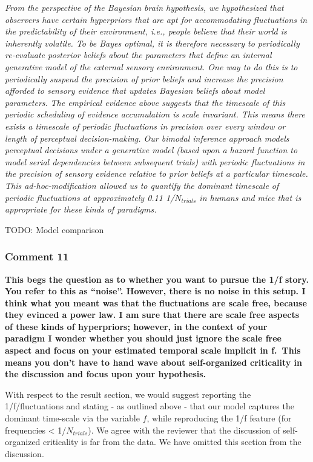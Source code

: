 \documentclass[
]{article}
\begin{document}
\emph{From the perspective of the Bayesian brain hypothesis, we
hypothesized that observers have certain hyperpriors that are apt for
accommodating fluctuations in the predictability of their environment,
i.e., people believe that their world is inherently volatile. To be
Bayes optimal, it is therefore necessary to periodically re-evaluate
posterior beliefs about the parameters that define an internal
generative model of the external sensory environment. One way to do this
is to periodically suspend the precision of prior beliefs and increase
the precision afforded to sensory evidence that updates Bayesian beliefs
about model parameters.} \emph{The empirical evidence above suggests
that the timescale of this periodic scheduling of evidence accumulation
is scale invariant. This means there exists a timescale of periodic
fluctuations in precision over every window or length of perceptual
decision-making. Our bimodal inference approach models perceptual
decisions under a generative model (based upon a hazard function to
model serial dependencies between subsequent trials) with periodic
fluctuations in the precision of sensory evidence relative to prior
beliefs at a particular timescale. This ad-hoc-modification allowed us
to quantify the dominant timescale of periodic fluctuations at
approximately 0.11 1/\(N_{trials}\) in humans and mice that is
appropriate for these kinds of paradigms.}

TODO: Model comparison

\hypertarget{comment-11}{%
\subsubsection{Comment 11}\label{comment-11}}

\textbf{This begs the question as to whether you want to pursue the 1/f
story. You refer to this as ``noise''. However, there is no noise in
this setup. I think what you meant was that the fluctuations are scale
free, because they evinced a power law. I am sure that there are scale
free aspects of these kinds of hyperpriors; however, in the context of
your paradigm I wonder whether you should just ignore the scale free
aspect and focus on your estimated temporal scale implicit in f.~This
means you don't have to hand wave about self-organized criticality in
the discussion and focus upon your hypothesis.}

With respect to the result section, we would suggest reporting the
1/f/fluctuations and stating - as outlined above - that our model
captures the dominant time-scale via the variable \(f\), while
reproducing the 1/f feature (for frequencies \textless{}
1/\(N_{trials}\)). We agree with the reviewer that the discussion of
self-organized criticality is far from the data. We have omitted this
section from the discussion.
\end{document}

